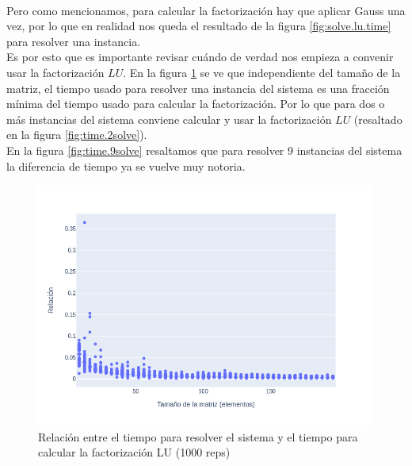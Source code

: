 \documentclass[12pt]{article}
\begin{document}
\paragraph{} Pero como mencionamos, para calcular la factorización hay que aplicar Gauss una vez, por lo que en realidad nos queda el resultado de la figura \ref{fig:solve.lu.time} para resolver una instancia. \\
Es por esto que es importante revisar cuándo de verdad nos empieza a convenir usar la factorización \(LU\). En la figura \ref{fig:pct_lu.time} se ve que independiente del tamaño de la matriz, el tiempo usado para resolver una instancia del sistema es una fracción mínima del tiempo usado para calcular la factorización. Por lo que para dos o más instancias del sistema conviene calcular y usar la factorización \(LU\) (resaltado en la figura \ref{fig:time.2solve}). \\
En la figura \ref{fig:time.9solve} resaltamos que para resolver 9 instancias del sistema la diferencia de tiempo ya se vuelve muy notoria.

\begin{figure}[H]
\centering
\includegraphics[scale=0.5]{times.1.t_pct_lu}
\caption{Relación entre el tiempo para resolver el sistema y el tiempo para calcular la factorización LU (1000 reps)}
\label{fig:pct_lu.time}
\end{figure}
\end{document}
